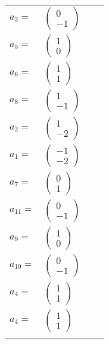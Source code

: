 \documentclass[1p]{elsarticle_modified}
\theoremstyle{definition}
\begin{document}
\begin{tabular}{m{7pt} m{180pt} m{7pt} m{180pt} }
\flushright $a_{3}=$&$\begin{pmatrix}0\\-1\end{pmatrix}$ \\
\flushright $a_{5}=$&$\begin{pmatrix}1\\0\end{pmatrix}$ \\
\flushright $a_{6}=$&$\begin{pmatrix}1\\1\end{pmatrix}$ \\
\flushright $a_{8}=$&$\begin{pmatrix}1\\-1\end{pmatrix}$ \\
\flushright $a_{2}=$&$\begin{pmatrix}1\\-2\end{pmatrix}$ \\
\flushright $a_{1}=$&$\begin{pmatrix}-1\\-2\end{pmatrix}$ \\
\flushright $a_{7}=$&$\begin{pmatrix}0\\1\end{pmatrix}$ \\
\flushright $a_{11}=$&$\begin{pmatrix}0\\-1\end{pmatrix}$ \\
\flushright $a_{9}=$&$\begin{pmatrix}1\\0\end{pmatrix}$ \\
\flushright $a_{10}=$&$\begin{pmatrix}0\\-1\end{pmatrix}$ \\
\flushright $a_{4}=$&$\begin{pmatrix}1\\1\end{pmatrix}$\\ \flushright $a_{4}=$&$\begin{pmatrix}1\\1\end{pmatrix}$\\&\end{tabular}
\end{document}
